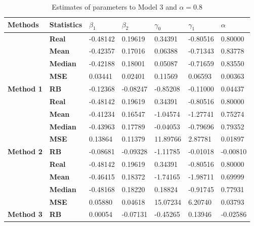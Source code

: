 \begin{table}

\caption{\label{tab:Est_model_3_Alpha0.8}Estimates of parameters to Model 3 and $\alpha=0.8$}
\centering
\begin{tabular}[t]{>{}l>{}llllll}
\toprule
Methods & Statistics & $\beta_1$ & $\beta_2$ & $\gamma_0$ & $\gamma_1$ & $\alpha$\\
\midrule
 & \textbf{Real} & -0.48142 & 0.19619 & 0.34391 & -0.80516 & 0.80000\\
\cmidrule{2-7}
 & \textbf{Mean} & -0.42357 & 0.17016 & 0.06388 & -0.71343 & 0.83778\\
\cmidrule{2-7}
 & \textbf{Median} & -0.42188 & 0.18001 & 0.05087 & -0.71659 & 0.83550\\
\cmidrule{2-7}
 & \textbf{MSE} & 0.03441 & 0.02401 & 0.11569 & 0.06593 & 0.00363\\
\cmidrule{2-7}
\multirow{-5}{*}{\raggedright\arraybackslash \textbf{Method 1}} & \textbf{RB} & -0.12368 & -0.08247 & -0.85208 & -0.11000 & 0.04437\\
\cmidrule{1-7}
 & \textbf{Real} & -0.48142 & 0.19619 & 0.34391 & -0.80516 & 0.80000\\
\cmidrule{2-7}
 & \textbf{Mean} & -0.41234 & 0.16547 & -1.04574 & -1.27741 & 0.75274\\
\cmidrule{2-7}
 & \textbf{Median} & -0.43963 & 0.17789 & -0.04053 & -0.79696 & 0.79352\\
\cmidrule{2-7}
 & \textbf{MSE} & 0.13864 & 0.11379 & 11.89766 & 2.87781 & 0.01897\\
\cmidrule{2-7}
\multirow{-5}{*}{\raggedright\arraybackslash \textbf{Method 2}} & \textbf{RB} & -0.08681 & -0.09328 & -1.11785 & -0.01018 & -0.00810\\
\cmidrule{1-7}
 & \textbf{Real} & -0.48142 & 0.19619 & 0.34391 & -0.80516 & 0.80000\\
\cmidrule{2-7}
 & \textbf{Mean} & -0.46415 & 0.18372 & -1.74165 & -1.98711 & 0.69999\\
\cmidrule{2-7}
 & \textbf{Median} & -0.48168 & 0.18220 & 0.18824 & -0.91745 & 0.77931\\
\cmidrule{2-7}
 & \textbf{MSE} & 0.05880 & 0.04618 & 15.07234 & 6.20740 & 0.03793\\
\cmidrule{2-7}
\multirow{-5}{*}{\raggedright\arraybackslash \textbf{Method 3}} & \textbf{RB} & 0.00054 & -0.07131 & -0.45265 & 0.13946 & -0.02586\\
\bottomrule
\end{tabular}
\end{table}
